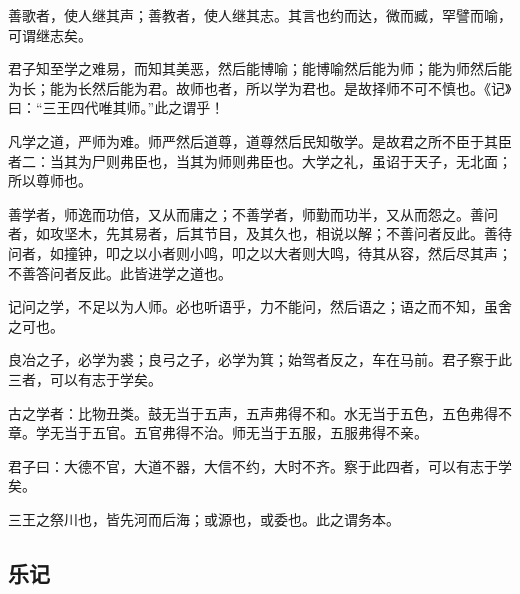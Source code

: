 \documentclass[]{article}
\begin{document}
善歌者，使人继其声；善教者，使人继其志。其言也约而达，微而臧，罕譬而喻，可谓继志矣。

君子知至学之难易，而知其美恶，然后能博喻；能博喻然后能为师；能为师然后能为长；能为长然后能为君。故师也者，所以学为君也。是故择师不可不慎也。《记》曰：``三王四代唯其师。''此之谓乎！

凡学之道，严师为难。师严然后道尊，道尊然后民知敬学。是故君之所不臣于其臣者二：当其为尸则弗臣也，当其为师则弗臣也。大学之礼，虽诏于天子，无北面；所以尊师也。

善学者，师逸而功倍，又从而庸之；不善学者，师勤而功半，又从而怨之。善问者，如攻坚木，先其易者，后其节目，及其久也，相说以解；不善问者反此。善待问者，如撞钟，叩之以小者则小鸣，叩之以大者则大鸣，待其从容，然后尽其声；不善答问者反此。此皆进学之道也。

记问之学，不足以为人师。必也听语乎，力不能问，然后语之；语之而不知，虽舍之可也。

良冶之子，必学为裘；良弓之子，必学为箕；始驾者反之，车在马前。君子察于此三者，可以有志于学矣。

古之学者：比物丑类。鼓无当于五声，五声弗得不和。水无当于五色，五色弗得不章。学无当于五官。五官弗得不治。师无当于五服，五服弗得不亲。

君子曰：大德不官，大道不器，大信不约，大时不齐。察于此四者，可以有志于学矣。

三王之祭川也，皆先河而后海；或源也，或委也。此之谓务本。

\hypertarget{header-n547}{%
\subsection{乐记}\label{header-n547}}
\end{document}
